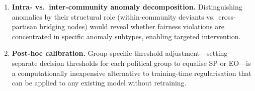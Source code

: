\documentclass[sigconf,natbib=false]{acmart}
\begin{document}
\begin{enumerate}[leftmargin=*]
    \item \textbf{Intra- vs.\ inter-community anomaly decomposition.} Distinguishing anomalies by their structural role (within-community deviants vs.\ cross-partisan bridging nodes) would reveal whether fairness violations are concentrated in specific anomaly subtypes, enabling targeted intervention.

    \item \textbf{Post-hoc calibration.} Group-specific threshold adjustment—setting separate decision thresholds for each political group to equalise SP or EO—is a computationally inexpensive alternative to training-time regularisation that can be applied to any existing model without retraining.
\end{enumerate}

\end{document}
